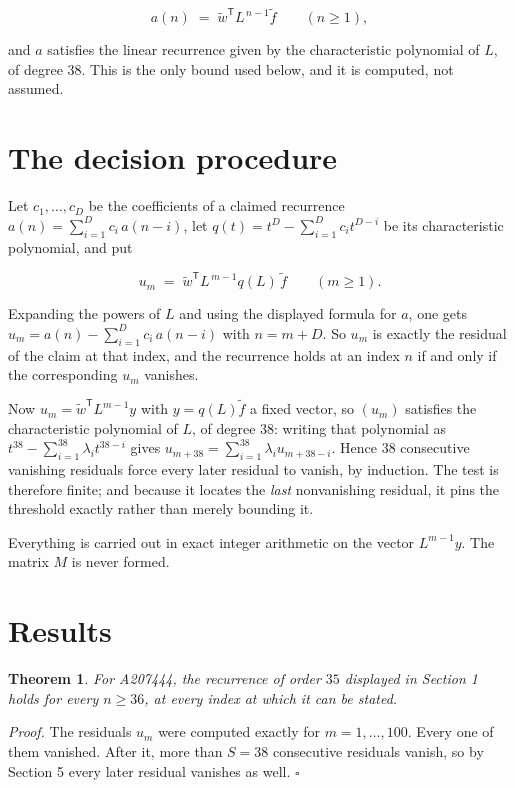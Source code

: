 \documentclass[11pt]{article}
\newtheorem{theorem}{Theorem}
\theoremstyle{definition}
\begin{document}
\[a(n) \;=\; \tilde w^{\mathsf T} L^{\,n-1} \tilde f \qquad (n \ge 1),\]

and $a$ satisfies the linear recurrence given by the characteristic polynomial of $L$, of degree $38$. This is the only bound used below, and it is computed, not assumed.

\section{The decision procedure}

Let $c_1,\dots,c_D$ be the coefficients of a claimed recurrence $a(n) = \sum_{i=1}^{D} c_i\,a(n-i)$, let $q(t) = t^{D} - \sum_{i=1}^{D} c_i t^{D-i}$ be its characteristic polynomial, and put

\[u_m \;=\; \tilde w^{\mathsf T} L^{\,m-1} q(L)\,\tilde f \qquad (m \ge 1).\]

Expanding the powers of $L$ and using the displayed formula for $a$, one gets $u_m = a(n) - \sum_{i=1}^{D} c_i\,a(n-i)$ with $n = m + D$. So $u_m$ is exactly the residual of the claim at that index, and the recurrence holds at an index $n$ if and only if the corresponding $u_m$ vanishes.

Now $u_m = \tilde w^{\mathsf T} L^{m-1} y$ with $y = q(L)\tilde f$ a fixed vector, so $(u_m)$ satisfies the characteristic polynomial of $L$, of degree $38$: writing that polynomial as $t^{38} - \sum_{i=1}^{38} \lambda_i t^{38-i}$ gives $u_{m+38} = \sum_{i=1}^{38} \lambda_i u_{m+38-i}$. Hence $38$ consecutive vanishing residuals force every later residual to vanish, by induction. The test is therefore finite; and because it locates the {\itshape last} nonvanishing residual, it pins the threshold exactly rather than merely bounding it.

Everything is carried out in exact integer arithmetic on the vector $L^{m-1}y$. The matrix $M$ is never formed.

\section{Results}

\begin{theorem} For A207444, the recurrence of order $35$ displayed in Section 1 holds for every $n \ge 36$, at every index at which it can be stated.\end{theorem}

{\itshape Proof.} The residuals $u_m$ were computed exactly for $m = 1,\dots,100$. Every one of them vanished. After it, more than $S = 38$ consecutive residuals vanish, so by Section 5 every later residual vanishes as well. $\square$
\end{document}
